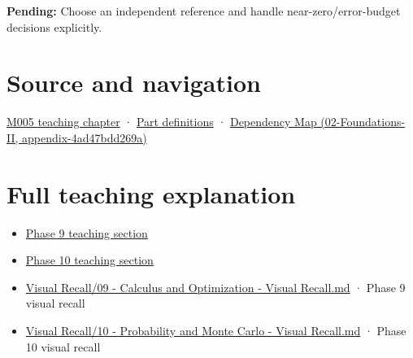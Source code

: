 \textbf{Pending:} Choose an independent reference and handle near-zero/error-budget decisions explicitly.

\section{Source and navigation}\label{appendix-3ae74e89b4e6-source-and-navigation}

\href{Continuous\%20Notes/Computing\%20Foundations\%20-\%20From\%20Bits\%20to\%20C++\%20and\%20Systems\%20APIs\#When\%20arithmetic\%20meets\%20uncertainty}{M005 teaching chapter} · \hyperref[appendix-fd090d982a15-m005---parts-77-88]{Part definitions} · \href{../02-Foundations-II/main.pdf\#nameddest=appendix-4ad47bdd269a}{Dependency Map (02-Foundations-II, appendix-4ad47bdd269a)}

\section{Full teaching explanation}\label{appendix-3ae74e89b4e6-full-teaching-explanation}

\begin{itemize}
\tightlist
\item
  \href{Continuous\%20Notes/Computing\%20Foundations\%20-\%20From\%20Bits\%20to\%20C++\%20and\%20Systems\%20APIs\#Numerical\%20differentiation\%20and\%20automatic\%20differentiation}{Phase 9 teaching section}
\item
  \href{Continuous\%20Notes/Computing\%20Foundations\%20-\%20From\%20Bits\%20to\%20C++\%20and\%20Systems\%20APIs\#10.\%20Inference\%20and\%20error\%20metrics\%20need\%20explicit\%20assumptions}{Phase 10 teaching section}
\item
  \hyperref[appendix-adf48f5dc5c1]{Visual Recall/09 - Calculus and Optimization - Visual Recall.md} · Phase 9 visual recall
\item
  \hyperref[appendix-cb5af353ef77]{Visual Recall/10 - Probability and Monte Carlo - Visual Recall.md} · Phase 10 visual recall
\end{itemize}
